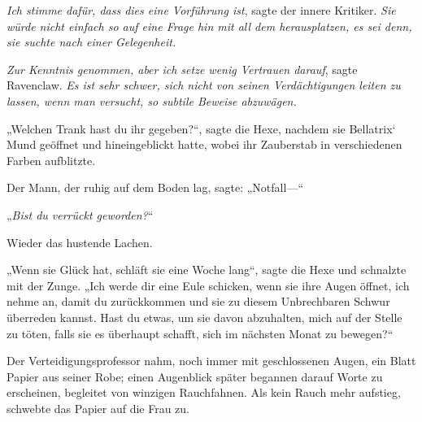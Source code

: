 \emph{Ich stimme dafür, dass dies eine Vorführung ist}, sagte der innere Kritiker. \emph{Sie würde nicht einfach so auf eine Frage hin mit all dem herausplatzen, es sei denn, sie suchte nach einer Gelegenheit.}

\emph{Zur Kenntnis genommen, aber ich setze wenig Vertrauen darauf}, sagte Ravenclaw. \emph{Es ist sehr schwer, sich nicht von seinen Verdächtigungen leiten zu lassen, wenn man versucht, so subtile Beweise abzuwägen.}

„Welchen Trank hast du ihr gegeben?“, sagte die Hexe, nachdem sie Bellatrix‘ Mund geöffnet und hineingeblickt hatte, wobei ihr Zauberstab in verschiedenen Farben aufblitzte.

Der Mann, der ruhig auf dem Boden lag, sagte: „Notfall—“

„\emph{Bist du verrückt geworden?}“

Wieder das hustende Lachen.

„Wenn sie Glück hat, schläft sie eine Woche lang“, sagte die Hexe und schnalzte mit der Zunge. „Ich werde dir eine Eule schicken, wenn sie ihre Augen öffnet, ich nehme an, damit du zurückkommen und sie zu diesem Unbrechbaren Schwur überreden kannst. Hast du etwas, um sie davon abzuhalten, mich auf der Stelle zu töten, falls sie es überhaupt schafft, sich im nächsten Monat zu bewegen?“

Der Verteidigungsprofessor nahm, noch immer mit geschlossenen Augen, ein Blatt Papier aus seiner Robe; einen Augenblick später begannen darauf Worte zu erscheinen, begleitet von winzigen Rauchfahnen. Als kein Rauch mehr aufstieg, schwebte das Papier auf die Frau zu.

